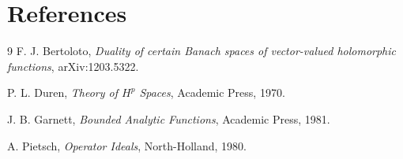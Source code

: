 \documentclass[11pt]{article}
\begin{document}
\section*{References}

\begin{thebibliography}{9}
F. J. Bertoloto,
\emph{Duality of certain Banach spaces of vector-valued holomorphic functions},
arXiv:1203.5322.

P. L. Duren,
\emph{Theory of \(H^p\) Spaces},
Academic Press, 1970.

J. B. Garnett,
\emph{Bounded Analytic Functions},
Academic Press, 1981.

A. Pietsch,
\emph{Operator Ideals},
North-Holland, 1980.
\end{thebibliography}
\end{document}
